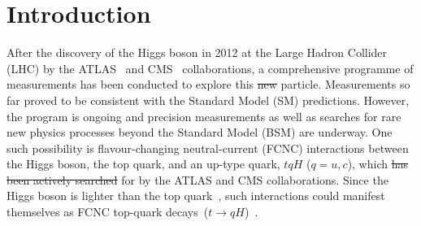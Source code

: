 \documentclass[PAPER, coverpage, atlasdraft=true, texlive=2016, UKenglish]{\ATLASLATEXPATH atlasdoc}
\providecommand{\DIFadd}[1]{{\protect\color{blue}\uwave{#1}}} %
\providecommand{\DIFdel}[1]{{\protect\color{red}\sout{#1}}}                      %
\providecommand{\DIFaddbegin}{} %
\providecommand{\DIFaddend}{} %
\providecommand{\DIFdelbegin}{} %
\providecommand{\DIFdelend}{} %
\begin{document}
\maketitle

\tableofcontents

\section{Introduction}
\label{sec:intro}
After the discovery of the Higgs boson in 2012 at the Large Hadron Collider (LHC) by the ATLAS~\cite{Aad:2012tfa} and 
CMS~\cite{Chatrchyan:2012ufa} collaborations, 
a comprehensive programme of measurements %
has been conducted to explore this \DIFdelbegin \DIFdel{new }\DIFdelend particle. Measurements so far \DIFaddbegin \DIFadd{have }\DIFaddend proved to be consistent with the Standard Model (SM) predictions. 
However, the program is ongoing and precision measurements as well as searches for rare new physics processes beyond the Standard Model (BSM)
are underway. One such possibility is flavour-changing neutral-current (FCNC) interactions between the Higgs boson, 
the top quark, and an up-type quark, $tqH$ ($q=u, c$), which \DIFdelbegin \DIFdel{has been actively searched }\DIFdelend \DIFaddbegin \DIFadd{have been sought }\DIFaddend for by the ATLAS and CMS collaborations.  
Since the Higgs boson is lighter than the top quark~\cite{Aad:2015zhl},
such interactions could manifest themselves as FCNC top-quark decays~($t\to qH$)~\cite{Agashe:2013hma}.
\end{document}
